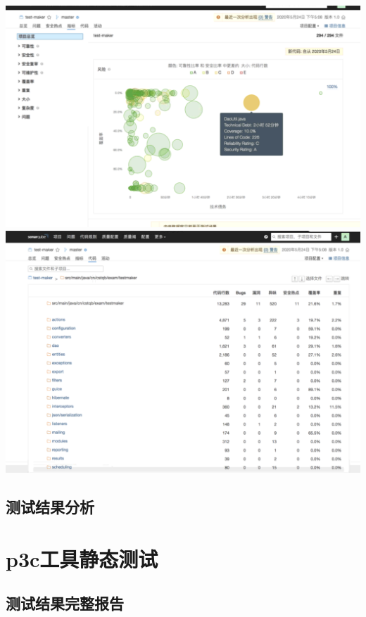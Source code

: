\documentclass[hyperref, a4paper]{ctexart}
\begin{document}
\includegraphics{screenshots/lab7-pic/back-5.png}
\includegraphics{screenshots/lab7-pic/back-6.png}

\hypertarget{ux6d4bux8bd5ux7ed3ux679cux5206ux6790}{%
\subsection{测试结果分析}\label{ux6d4bux8bd5ux7ed3ux679cux5206ux6790}}

\hypertarget{p3cux5de5ux5177ux9759ux6001ux6d4bux8bd5}{%
\section{p3c工具静态测试}\label{p3cux5de5ux5177ux9759ux6001ux6d4bux8bd5}}

\hypertarget{ux6d4bux8bd5ux7ed3ux679cux5b8cux6574ux62a5ux544a-1}{%
\subsection{测试结果完整报告}\label{ux6d4bux8bd5ux7ed3ux679cux5b8cux6574ux62a5ux544a-1}}
\end{document}
